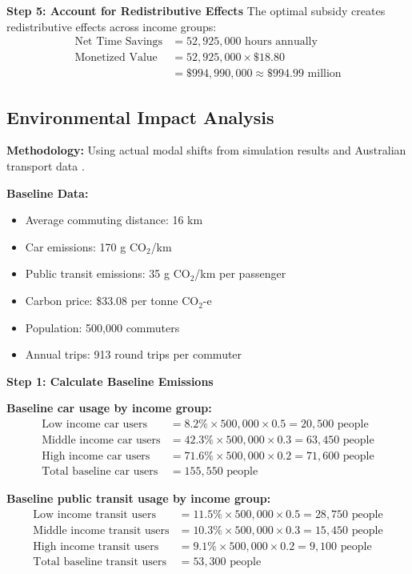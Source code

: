 \textbf{Step 5: Account for Redistributive Effects}
The optimal subsidy creates redistributive effects across income groups:
\begin{align}
\text{Net Time Savings} &=52,925,000 \text{ hours annually} \\
\text{Monetized Value} &= 52,925,000 \times \$18.80 \\
&= \$994,990,000 \approx \$994.99 \text{ million}
\end{align}

\subsection{Environmental Impact Analysis}

\textbf{Methodology:}
Using actual modal shifts from simulation results and Australian transport data \citep{ABS_Census_2016, ourworldindata_transport_2023}.

\textbf{Baseline Data:}
\begin{itemize}
    \item Average commuting distance: 16 km \citep{ABS_Census_2016}
    \item Car emissions: 170 g CO$_2$/km \citep{ourworldindata_transport_2023}
    \item Public transit emissions: 35 g CO$_2$/km per passenger \citep{ourworldindata_transport_2023}
    \item Carbon price: \$33.08 per tonne CO$_2$-e \citep{CER_ACCU_2025}
    \item Population: 500,000 commuters
    \item Annual trips: 913 round trips per commuter
\end{itemize}

\textbf{Step 1: Calculate Baseline Emissions}

\textbf{Baseline car usage by income group:}
\begin{align}
\text{Low income car users} &= 8.2\% \times 500,000\times0.5 = 20,500 \text{ people} \\
\text{Middle income car users} &= 42.3\% \times 500,000\times0.3 = 63,450 \text{ people} \\
\text{High income car users} &= 71.6\% \times 500,000\times0.2 = 71,600 \text{ people} \\
\text{Total baseline car users} &= 155,550 \text{ people}
\end{align}

\textbf{Baseline public transit usage by income group:}
\begin{align}
\text{Low income transit users} &= 11.5\% \times 500,000\times0.5 = 28,750 \text{ people} \\
\text{Middle income transit users} &= 10.3\% \times 500,000\times0.3 = 15,450 \text{ people} \\
\text{High income transit users} &= 9.1\% \times 500,000\times0.2 = 9,100 \text{ people} \\
\text{Total baseline transit users} &= 53,300 \text{ people}
\end{align}

